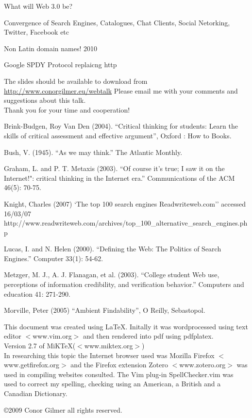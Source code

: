\documentclass[30pt,landscape,footrule]{foils}
\begin{document}
{\color{magenta}
What will Web 3.0 be?
\begin{itemize}
\small{
\item Convergence of Search Engines, Catalogues, Chat Clients, Social Netorking, Twitter, Facebook etc
\item Non Latin domain names! 2010
\item Google SPDY Protocol replaicng http
}
\end{itemize}
}



\pausecolorreset

The slides should be available to download from 
\href{http://www.conorgilmer.eu/webtalk/}{http://www.conorgilmer.eu/webtalk}
Please email me with your comments and suggestions about this talk.\\
Thank you for your time and cooperation!

\begin{itemize}
\small {
\item Brink-Budgen, Roy Van Den (2004). ``Critical thinking for students: Learn the skills of critical assessment and effective argument'', Oxford : How to Books.
\item Bush, V. (1945). ``As we may think.'' The Atlantic Monthly.
\item Graham, L. and P. T. Metaxis (2003). ``Of course it's true; I saw it on the Internet!": critical thinking in the Internet era.'' Communications of the ACM 46(5): 70-75.
\item Knight, Charles (2007) `The top 100 search engines Readwriteweb.com'' accessed 16/03/07 http://www.readwriteweb.com/archives/top\_100\_alternative\_search\_engines.php
\item Lucas, I. and N. Helen (2000). ``Defining the Web: The Politics of Search Engines.'' Computer 33(1): 54-62.
\item Metzger, M. J., A. J. Flanagan, et al. (2003). ``College student Web use, perceptions of information credibility, and verification behavior.'' Computers and education 41: 271-290.
\item Morville, Peter (2005) ``Ambient Findability'', O Reilly, Sebastopol.
}
\end{itemize}


This document was created using \LaTeX{}. Initally it was wordprocessed using text editor $<${www.vim.org}$>$ and then rendered into pdf using pdfplatex. \\
Version 2.7 of MiKTeX($<${www.miktex.org}$>$)\\ In researching this topic the Internet browser used was Mozilla Firefox  $<${www.getfirefox.org}$>$ and the Firefox extension Zotero $<${www.zotero.org}$>$ was used  in compiling websites consulted. The Vim plug-in SpellChecker.vim was used to correct my spelling, checking using an American, a British and a Canadian Dictionary.

\copyright 2009 Conor Gilmer  all rights reserved.
\end{document}

